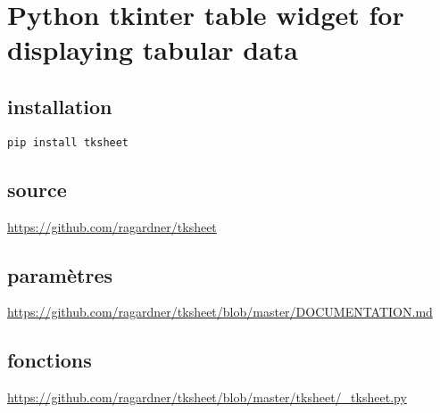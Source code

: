 \documentclass[11pt]{article}
\begin{document}
\section{Python tkinter table widget for displaying tabular data}
\label{sec:org1a6b6a1}

\subsection{installation}
\label{sec:org2a6dd1e}
\begin{verbatim}
pip install tksheet
\end{verbatim}

\subsection{source}
\label{sec:orge85f90b}
\url{https://github.com/ragardner/tksheet}

\subsection{paramètres}
\label{sec:org11498f4}
\url{https://github.com/ragardner/tksheet/blob/master/DOCUMENTATION.md}

\subsection{fonctions}
\label{sec:orgf4e994f}
\url{https://github.com/ragardner/tksheet/blob/master/tksheet/\_tksheet.py}
\end{document}
